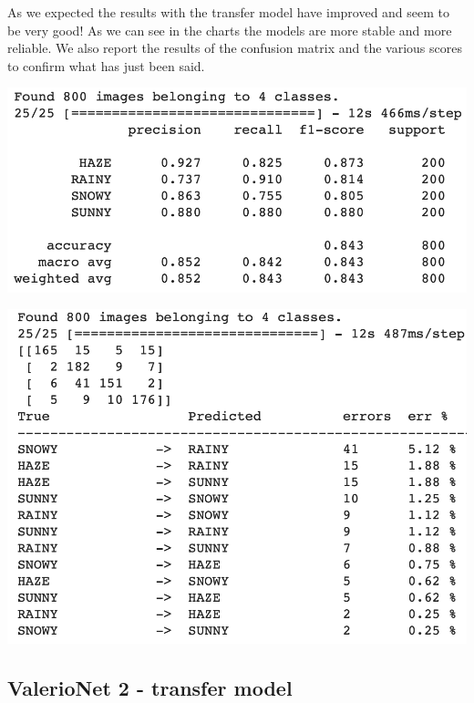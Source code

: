 \documentclass[12pt]{article}
\begin{document}
As we expected the results with the transfer model have improved and seem to be very good! As we can see in the charts the models are more stable and more reliable. We also report the results of the confusion matrix and the various scores to confirm what has just been said. \newline
\begin{minipage}[c]{.5\textwidth}
   \centering
   \includegraphics[width=\textwidth]{pic6}
\end{minipage}
\hspace{1em}
\begin{minipage}[c]{.5\textwidth}
   \centering
   \includegraphics[width=\textwidth]{pic7}
\end{minipage}

\subsection{ValerioNet 2 - transfer model}
\end{document}
